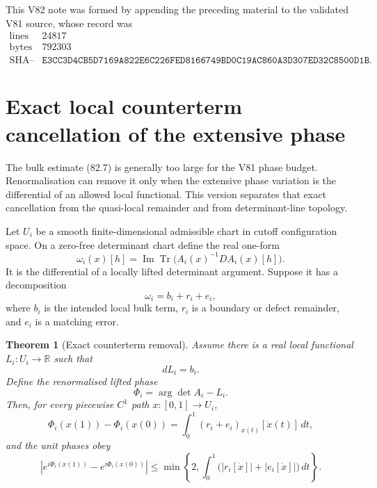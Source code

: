 \documentclass[11pt]{article}
\newtheorem{theorem}{Theorem}[section]
\begin{document}
This V82 note was formed by appending the preceding material to the
validated V81 source, whose record was
\[
\begin{array}{c|c}
\text{lines}&24817\\
\text{bytes}&792303\\
\text{SHA--256}&
\texttt{E3CC3D4CB5D7169A822E6C226FED8166749BD0C19AC860A3D307ED32C8500D1B}.
\end{array}                                                     \tag{82.21}
\]


\section{Exact local counterterm cancellation of the extensive phase}
\label{sec:v11v83}

The bulk estimate (82.7) is generally too large for the V81 phase
budget.  Renormalisation can remove it only when the extensive phase
variation is the differential of an allowed local functional.  This
version separates that exact cancellation from the quasi-local
remainder and from determinant-line topology.

Let \(U_i\) be a smooth finite-dimensional admissible chart in cutoff
configuration space.  On a zero-free determinant chart define the
real one-form
\[
 \omega_i(x)[h]
 =\operatorname{Im}\operatorname{Tr}
       \big(A_i(x)^{-1}D A_i(x)[h]\big).                     \tag{83.1}
\]
It is the differential of a locally lifted determinant argument.
Suppose it has a decomposition
\[
                              \omega_i=b_i+r_i+e_i,           \tag{83.2}
\]
where \(b_i\) is the intended local bulk term, \(r_i\) is a boundary
or defect remainder, and \(e_i\) is a matching error.

\begin{theorem}[Exact counterterm removal]
\label{thm:v11v83-cancel}
Assume there is a real local functional \(L_i:U_i\to\mathbb R\) such
that
\[
                                      dL_i=b_i.              \tag{83.3}
\]
Define the renormalised lifted phase
\[
                       \Phi_i=\arg\det A_i-L_i.              \tag{83.4}
\]
Then, for every piecewise \(C^1\) path \(x:[0,1]\to U_i\),
\[
 \Phi_i(x(1))-\Phi_i(x(0))
       =\int_0^1(r_i+e_i)_{x(t)}[\dot x(t)]\,dt,              \tag{83.5}
\]
and the unit phases obey
\[
 \left|e^{i\Phi_i(x(1))}-e^{i\Phi_i(x(0))}\right|
 \le\min\left\{2,\int_0^1
       \big(|r_i[\dot x]|+|e_i[\dot x]|\big)\,dt\right\}.     \tag{83.6}
\]
\end{theorem}
\end{document}
